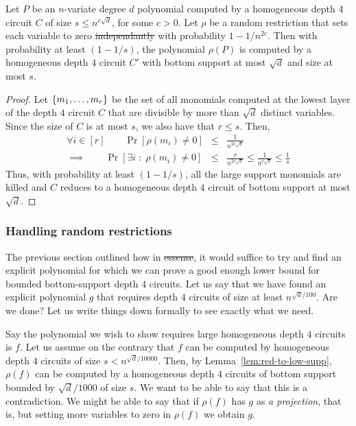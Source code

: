 \documentclass{beatcs}
\providecommand{\DIFaddtex}[1]{{\protect\color{blue}\uwave{#1}}} %
\providecommand{\DIFdeltex}[1]{{\protect\color{red}\sout{#1}}}                      %
\providecommand{\DIFaddbegin}{} %
\providecommand{\DIFaddend}{} %
\providecommand{\DIFdelbegin}{} %
\providecommand{\DIFdelend}{} %
\providecommand{\DIFadd}[1]{\texorpdfstring{\DIFaddtex{#1}}{#1}} %
\providecommand{\DIFdel}[1]{\texorpdfstring{\DIFdeltex{#1}}{}} %
\begin{document}
\begin{lemma}\label{lem:red-to-low-supp}
Let $P$ be an $n$-variate degree $d$ polynomial computed by a homogeneous depth $4$ circuit $C$ of size $s \leq n^{c\sqrt{d}}$, for some $c>0$. Let $\rho$ be a random restriction that sets each variable to zero \DIFdelbegin \DIFdel{independantly }\DIFdelend \DIFaddbegin \DIFadd{independently }\DIFaddend with probability $1 - 1/n^{2c}$. Then with probability at least $(1 - 1/s)$, the polynomial $\rho(P)$ is computed by a homogeneous depth $4$ circuit $C'$ with bottom support at most $\sqrt{d}$ and size at most $s$. 
\end{lemma}
\begin{proof}
Let $\left\{m_1,\dots, m_r\right\}$ be the set of all monomials computed at the lowest layer of the depth $4$ circuit $C$ that are divisible by more than $\sqrt{d}$ distinct variables. Since the size of $C$ is at most $s$, we also have that $r\leq s$. Then,
\begin{eqnarray*}
\forall i\in [r] \qquad \Pr[\rho(m_i) \neq 0] & \leq & \frac{1}{n^{2c\sqrt{d}}}\\
\implies \qquad \Pr[\exists i \;:\; \rho(m_i) \neq 0] & \leq & \frac{r}{n^{2c\sqrt{d}}} \leq \frac{1}{n^{c\sqrt{d}}} \leq \frac{1}{s}
\end{eqnarray*}
Thus, with probability at least $(1 - 1/s)$, all the large support monomials are killed and $C$ reduces to a homogeneous depth $4$ circuit of bottom support at most $\sqrt{d}$. 
\end{proof}

\subsubsection{Handling random restrictions}

The previous section outlined how in \DIFdelbegin \DIFdel{essense}\DIFdelend \DIFaddbegin \DIFadd{essence}\DIFaddend , it would suffice to try and find an explicit polynomial for which we can prove a good enough lower bound for bounded bottom-support depth $4$ circuits. Let us say that we have found an explicit polynomial $g$ that requires depth $4$ circuits of size at least $n^{\sqrt{d}/100}$. Are we done? Let us write things down formally to see exactly what we need. 

Say the polynomial we wish to show requires large homogeneous depth $4$ circuits is $f$. Let us assume on the contrary that $f$ can be computed by homogeneous depth $4$ circuits of size $s < n^{\sqrt{d}/10000}$. Then, by Lemma~\ref{lem:red-to-low-supp}, $\rho(f)$ can be computed by a homogeneous depth $4$ circuits of bottom support bounded by $\sqrt{d}/1000$ of size $s$. We want to be able to say that this is a contradiction. We might be able to say that if $\rho(f)$ has $g$ as \emph{a projection}, that is, but setting more variables to zero in $\rho(f)$ we obtain $g$. 
\end{document}
